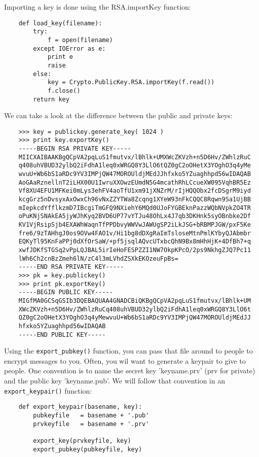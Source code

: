 \documentclass[letterpaper,10pt]{article}
\begin{document}
Importing a key is done using the RSA.importKey function:
\begin{verbatim}
    def load_key(filename):
        try:
            f = open(filename)
        except IOError as e:
            print e
            raise
        else:
            key = Crypto.PublicKey.RSA.importKey(f.read())
            f.close()
        return key

\end{verbatim}

We can take a look at the difference between the public and private keys:
\begin{verbatim}
    >>> key = publickey.generate_key( 1024 )
    >>> print key.exportKey()
    -----BEGIN RSA PRIVATE KEY-----
    MIICXAIBAAKBgQCpVA2pqLuS1fmutvx/lBhlk+UMXWcZKVzh+n5D6Hv/ZWhlzRuC
    q408uhVBUD32ylbQ2iFdhA1leq0xWRGQ8Y3LlO6tQZ0gC2oOHetX3YOghO3q4yMe
    wvuU+Wb6bS1aRDc9YV3IMPjQW47MOROUldjMEdJJhfxko5YZuaghhpd56wIDAQAB
    AoGAaRznellnT2iLHX00U1IwruXXOwzEUmdN5G4mcathRhLCcueXW095VqhBR5Ez
    Vf8XU4EFU1MFKei0mLys3ehFV4aoTfU1xm91jXNZrM/rIjHQQObx2fcDSgrM9iyd
    kcgGrz5nDvsyxAxOwxCh96vNxZZYTWa8Zcqng1XYeW93nFkCQQC8Rqwn9Sa1UjBB
    mIepkcdYfflkzmD7IBcgiTmGFQ9NXiehY6MQd0UJoFYGBEknPazzWQbNVpkZO4TR
    oPuKNjSNAkEA5jyWJhKyq2BVD6UP77vYTJu48OhLx4J7qb3DKHnk5syOBnbke2Df
    KV1VjRsipSjb4EXAWhWaqnTfPPDbvyWWVwJAWUgSP2iLkJSG+bRBMPJGW/pxF5Ke
    fre6/9zTAHhgJ0os9OVw4FAO1v/Hi1bg8dDXgRaImTsloseMtnPmlKYbyQJAbmbr
    EQKyTl95KnFaPPj0dXfOrSaW/+pf5jsqlAQvcUTxbcQhN9Bx8mHhHjK+4DfBh7+q
    xwfJDKfSTGSq2vPpLQJBAL5irIeHoFESPZZI1NW7OkpKPcO/2ps9NkhgZJQ7Pc11
    lWh6Ch2cnBzZmeh6lN/zC4l3mLVhdZSXkEKOzeuFpBs=
    -----END RSA PRIVATE KEY-----
    >>> pk = key.publickey()
    >>> print pk.exportKey()
    -----BEGIN PUBLIC KEY-----
    MIGfMA0GCSqGSIb3DQEBAQUAA4GNADCBiQKBgQCpVA2pqLuS1fmutvx/lBhlk+UM
    XWcZKVzh+n5D6Hv/ZWhlzRuCq408uhVBUD32ylbQ2iFdhA1leq0xWRGQ8Y3LlO6t
    QZ0gC2oOHetX3YOghO3q4yMewvuU+Wb6bS1aRDc9YV3IMPjQW47MOROUldjMEdJJ
    hfxko5YZuaghhpd56wIDAQAB
    -----END PUBLIC KEY-----
\end{verbatim}

Using the \verb|export_pubkey()| function, you can pass that file
around to people to encrypt messages to you. Often, you wil want to generate a 
keypair to give to people. One convention is to name the secret key 
'keyname.prv' (prv for private) and the public key 'keyname.pub'. We will
follow that convention in an \verb|export_keypair()| function:
\begin{verbatim}
    def export_keypair(basename, key):
        pubkeyfile   = basename + '.pub'
        prvkeyfile   = basename + '.prv'

        export_key(prvkeyfile, key)
        export_pubkey(pubkeyfile, key)
\end{verbatim}
\end{document}

